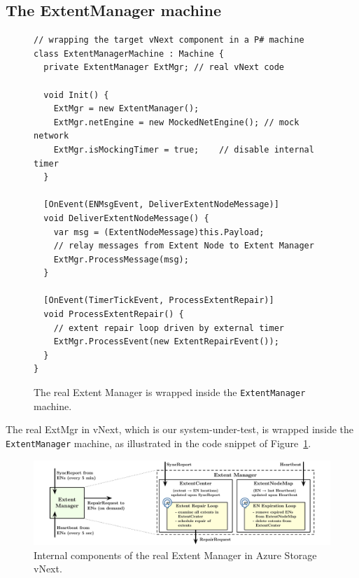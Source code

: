 \subsection{The ExtentManager machine}
\label{sec:method:wrap_target}

\begin{figure}[t]
\begin{lstlisting}
// wrapping the target vNext component in a P# machine
class ExtentManagerMachine : Machine {
  private ExtentManager ExtMgr; // real vNext code

  void Init() {
    ExtMgr = new ExtentManager();
    ExtMgr.netEngine = new MockedNetEngine(); // mock network
    ExtMgr.isMockingTimer = true;	 // disable internal timer
  }

  [OnEvent(ENMsgEvent, DeliverExtentNodeMessage)]
  void DeliverExtentNodeMessage() {
    var msg = (ExtentNodeMessage)this.Payload;
    // relay messages from Extent Node to Extent Manager
    ExtMgr.ProcessMessage(msg);
  }
	
  [OnEvent(TimerTickEvent, ProcessExtentRepair)]
  void ProcessExtentRepair() {
    // extent repair loop driven by external timer
    ExtMgr.ProcessEvent(new ExtentRepairEvent());
  }
}
\end{lstlisting}
\vspace{-3mm}
\caption{The real Extent Manager is wrapped inside the \texttt{ExtentManager} \psharp machine.}
\label{fig:wrap_target}
\end{figure}

The real ExtMgr in vNext, which is our system-under-test, is wrapped inside the \texttt{ExtentManager} machine, as illustrated in the code snippet of Figure~\ref{fig:wrap_target}.

\begin{figure}[t]
\centering
\includegraphics[width=.9\linewidth]{img/extent_manager}
\caption{Internal components of the real Extent Manager in Azure Storage vNext.}
\label{fig:extentmanager}
\vspace{-3mm}
\end{figure}

